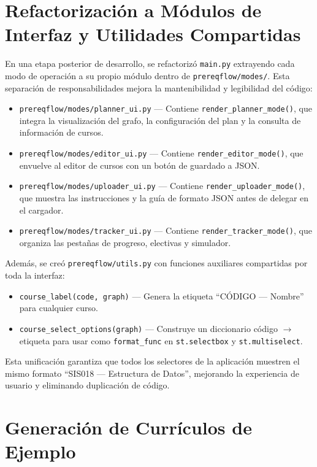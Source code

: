 \documentclass[12pt]{report}
\begin{document}
\section{Refactorización a Módulos de Interfaz y Utilidades Compartidas}

En una etapa posterior de desarrollo, se refactorizó \texttt{main.py} extrayendo cada modo de operación a su propio módulo dentro de \texttt{prereqflow/modes/}. Esta separación de responsabilidades mejora la mantenibilidad y legibilidad del código:

\begin{itemize}
    \item \texttt{prereqflow/modes/planner\_ui.py} — Contiene \texttt{render\_planner\_mode()}, que integra la visualización del grafo, la configuración del plan y la consulta de información de cursos.
    \item \texttt{prereqflow/modes/editor\_ui.py} — Contiene \texttt{render\_editor\_mode()}, que envuelve al editor de cursos con un botón de guardado a JSON.
    \item \texttt{prereqflow/modes/uploader\_ui.py} — Contiene \texttt{render\_uploader\_mode()}, que muestra las instrucciones y la guía de formato JSON antes de delegar en el cargador.
    \item \texttt{prereqflow/modes/tracker\_ui.py} — Contiene \texttt{render\_tracker\_mode()}, que organiza las pestañas de progreso, electivas y simulador.
\end{itemize}

Además, se creó \texttt{prereqflow/utils.py} con funciones auxiliares compartidas por toda la interfaz:

\begin{itemize}
    \item \texttt{course\_label(code, graph)} — Genera la etiqueta ``CÓDIGO — Nombre'' para cualquier curso.
    \item \texttt{course\_select\_options(graph)} — Construye un diccionario código $\to$ etiqueta para usar como \texttt{format\_func} en \texttt{st.selectbox} y \texttt{st.multiselect}.
\end{itemize}

Esta unificación garantiza que todos los selectores de la aplicación muestren el mismo formato ``SIS018 — Estructura de Datos'', mejorando la experiencia de usuario y eliminando duplicación de código.

\section{Generación de Currículos de Ejemplo}
\end{document}
